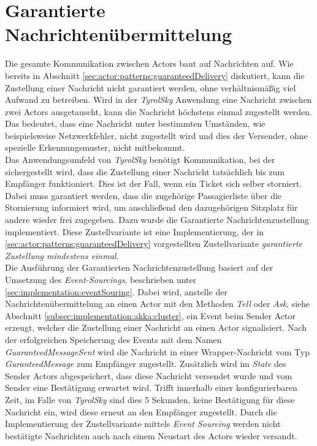 \section{Garantierte Nachrichtenübermittelung}
Die gesamte Kommunikation zwischen Actors baut auf Nachrichten auf. Wie bereits in Abschnitt \ref{sec:actor:patterns:guaranteedDelivery} diskutiert, kann die Zustellung einer Nachricht nicht garantiert werden, ohne verhältnismäßig viel Aufwand zu betreiben. Wird in der \textit{TyrolSky} Anwendung eine Nachricht zwischen zwei Actors ausgetauscht, kann die Nachricht höchstens einmal zugestellt werden. Das bedeutet, dass eine Nachricht unter bestimmten Umständen, wie beispielsweise Netzwerkfehler, nicht zugestellt wird und dies der Versender, ohne spezielle Erkennungsmuster, nicht mitbekommt. \\
Das Anwendungsumfeld von \textit{TyrolSky} benötigt  Kommunikation, bei der sichergestellt wird, dass die Zustellung einer Nachricht tatsächlich bis zum Empfänger funktioniert. Dies ist der Fall, wenn ein Ticket sich selber storniert. Dabei muss garantiert werden, dass die zugehörige Passagierliste über die Stornierung informiert wird, um anschließend den dazugehörigen Sitzplatz für andere wieder frei zugegeben. Dazu wurde die Garantierte Nachrichtenzustellung implementiert. Diese Zustellvariante ist eine Implementierung, der in \ref{sec:actor:patterns:guaranteedDelivery} vorgestellten Zustellvariante \textit{garantierte Zustellung mindestens einmal}. \\
Die Ausführung der Garantierten Nachrichtenzustellung basiert auf der Umsetzung des \textit{Event-Sourcings}, beschrieben unter \ref{sec:implementation:eventSouring}. Dabei wird, anstelle der Nachrichtenübermittelung an einen Actor mit den Methoden \textit{Tell} oder \textit{Ask}, siehe Abschnitt \ref{subsec:implementation:akka:cluster}, ein Event beim Sender Actor erzeugt, welcher die Zustellung einer Nachricht an einen Actor signalisiert. Nach der erfolgreichen Speicherung des Events mit dem Namen \textit{GuaranteedMessageSent} wird die Nachricht in einer Wrapper-Nachricht vom Typ \textit{GuranteedMessage} zum Empfänger zugestellt. Zusätzlich wird im \textit{State} des Sender Actors abgespeichert, dass diese Nachricht versendet wurde und vom Sender eine Bestätigung erwartet wird. Trifft innerhalb einer konfigurierbaren Zeit, im Falle von \textit{TyrolSky} sind dies 5 Sekunden, keine Bestätigung für diese Nachricht ein, wird diese erneut an den Empfänger zugestellt. Durch die Implementierung der Zustellvariante mittels \textit{Event Sourcing} werden nicht bestätigte Nachrichten auch nach einem Neustart des Actors wieder versandt. \\
